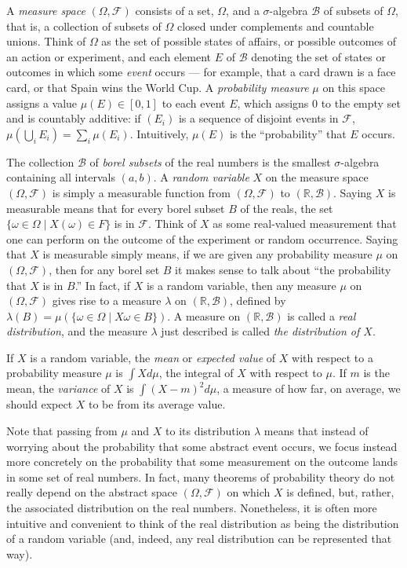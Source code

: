 \documentclass{article}
\newcommand{\RR}{\mathbb{R}}
\newcommand{\st}{ \; | \;}
\newcommand{\mdl}[1]{{\mathcal #1}}
\begin{document}
A \emph{measure space} $(\Omega, \mdl F)$ consists of a set, $\Omega$, and a $\sigma$-algebra $\mdl B$ of subsets of $\Omega$, that is, a collection of subsets of $\Omega$ closed under complements and countable unions. Think of $\Omega$ as the set of possible states of affairs, or possible outcomes of an action or experiment, and each element $E$ of $\mdl B$ denoting the set of states or outcomes in which some \emph{event} occurs --- for example, that a card drawn is a face card, or that Spain wins the World Cup. A \emph{probability measure} $\mu$ on this space assigns a value $\mu(E) \in [0, 1]$ to each event $E$, which assigns $0$ to the empty set and is countably additive: if $(E_i)$ is a sequence of disjoint events in $\mdl F$, $\mu(\bigcup_i E_i) = \sum_i \mu(E_i)$. Intuitively, $\mu(E)$ is the ``probability'' that $E$ occurs. 

The collection $\mdl B$ of \emph{borel subsets} of the real numbers is the smallest $\sigma$-algebra containing all intervals $(a, b)$. A \emph{random variable} $X$ on the measure space $(\Omega, \mdl F)$ is simply a measurable function from $(\Omega, \mdl F)$ to $(\RR, \mdl B)$. Saying $X$ is measurable means that for every borel subset $B$ of the reals, the set $\{ \omega \in \Omega \st X(\omega) \in F \}$ is in $\mdl F$. Think of $X$ as some real-valued measurement that one can perform on the outcome of the experiment or random occurrence. Saying that $X$ is measurable simply means, if we are given any probability measure $\mu$ on $(\Omega, \mdl F)$, then for any borel set $B$ it makes sense to talk about ``the probability that $X$ is in $B$.'' In fact, if $X$ is a random variable, then any measure $\mu$ on $(\Omega, \mdl F)$ gives rise to a measure $\lambda$ on $(\RR, \mdl B)$, defined by $\lambda(B) = \mu ( \{ \omega \in \Omega \st X \omega \in B \})$. A measure on $(\RR, \mdl B)$ is called a \emph{real distribution}, and the measure $\lambda$ just described is called \emph{the distribution of $X$}.

If $X$ is a random variable, the \emph{mean} or \emph{expected value} of $X$ with respect to a probability measure $\mu$ is $\int X d\mu$, the integral of $X$ with respect to $\mu$. If $m$ is the mean, the \emph{variance} of $X$ is $\int (X - m)^2 d\mu$, a measure of how far, on average, we should expect $X$ to be from its average value.

Note that passing from $\mu$ and $X$ to its distribution $\lambda$ means that instead of worrying about the probability that some abstract event occurs, we focus instead more concretely on the probability that some measurement on the outcome lands in some set of real numbers. In fact, many theorems of probability theory do not really depend on the abstract space $(\Omega, \mdl F)$ on which $X$ is defined, but, rather, the associated distribution on the real numbers. Nonetheless, it is often more intuitive and convenient to think of the real distribution as being the distribution of a random variable (and, indeed, any real distribution can be represented that way). 
\end{document}
